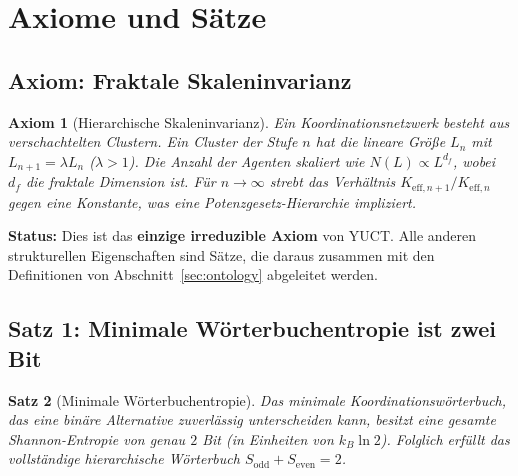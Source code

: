 \documentclass[12pt,a4paper]{article}
\newtheorem{theorem}{Satz}[section]
\newtheorem{axiom}[theorem]{Axiom}
\begin{document}
	\begin{center}
	\end{center}
	
	\section{Axiome und Sätze}
	\label{sec:axioms}
	
	\subsection{Axiom: Fraktale Skaleninvarianz}
	
	\begin{axiom}[Hierarchische Skaleninvarianz] \label{ax:A1}
		Ein Koordinationsnetzwerk besteht aus verschachtelten Clustern. Ein Cluster der Stufe \(n\) hat die lineare Größe \(L_n\) mit \(L_{n+1} = \lambda L_n\) (\(\lambda > 1\)). Die Anzahl der Agenten skaliert wie \(N(L) \propto L^{d_f}\), wobei \(d_f\) die fraktale Dimension ist. Für \(n \to \infty\) strebt das Verhältnis \(K_{\mathrm{eff},n+1}/K_{\mathrm{eff},n}\) gegen eine Konstante, was eine Potenzgesetz-Hierarchie impliziert.
	\end{axiom}
	
	\textbf{Status:} Dies ist das \textbf{einzige irreduzible Axiom} von YUCT. Alle anderen strukturellen Eigenschaften sind Sätze, die daraus zusammen mit den Definitionen von Abschnitt~\ref{sec:ontology} abgeleitet werden.
	
	\subsection{Satz 1: Minimale Wörterbuchentropie ist zwei Bit}
	
	\begin{theorem}[Minimale Wörterbuchentropie]
		\label{thm:minimal-dict}
		Das minimale Koordinationswörterbuch, das eine binäre Alternative zuverlässig unterscheiden kann, besitzt eine gesamte Shannon-Entropie von genau \(2\) Bit (in Einheiten von \(k_B\ln 2\)). Folglich erfüllt das vollständige hierarchische Wörterbuch \(S_{\mathrm{odd}} + S_{\mathrm{even}} = 2\).
	\end{theorem}
	
\end{document}
